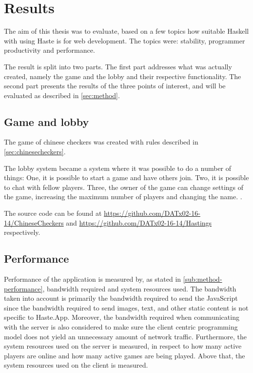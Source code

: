 \documentclass[a4paper]{article}
\begin{document}
\section{Results}
The aim of this thesis was to evaluate, based on a few topics how suitable Haskell with using Haste is for web development. 
The topics were: stability, programmer productivity and performance. 

The result is split into two parts. The first part addresses what was actually created, namely the game and the lobby and their respective functionality. The second part presents the results of the three points of interest, and will be evaluated as described in \cref{sec:method}.

\subsection{Game and lobby}
The game of chinese checkers was created with rules described in \cref{sec:chinesecheckers}.

The lobby system became a system where it was possible to do a number of things: One, it is possible to start a game and have others join. Two, it is possible to chat with fellow players. Three, the owner of the game can change settings of the game, increasing the maximum number of players and changing the name. .

The source code can be found at \url{https://github.com/DATx02-16-14/ChineseCheckers} and \url{https://github.com/DATx02-16-14/Hastings} respectively. 

\subsection{Performance}

Performance of the application is measured by, as stated in \cref{sub:method-performance}, bandwidth required and system resources used. The bandwidth taken into account is primarily the bandwidth required to send the JavaScript since the bandwidth required to send images, text, and other static content is not specific to Haste.App. Moreover, the bandwidth required when communicating with the server is also considered to make sure the client centric programming model does not yield an unnecessary amount of network traffic. Furthermore, the system resources used on the server is measured, in respect to how many active players are online and how many active games are being played. Above that, the system resources used on the client is measured. 
\end{document}
